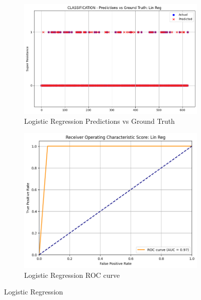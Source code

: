 \documentclass[manuscript,screen,review, nonacm]{acmart}
\begin{document}
  \begin{figure}[H]
      \centering
      \begin{subfigure}{0.45\textwidth}
          \includegraphics[width=\linewidth]{figs/lin1.png}
          \caption{Logistic Regression Predictions vs Ground Truth}

      \end{subfigure}
      \hfill
      \begin{subfigure}{0.45\textwidth}
          \includegraphics[width=\linewidth]{figs/lin2.png}
          \caption{Logistic Regression ROC curve}

      \end{subfigure}
      \caption{Logistic Regression}

  \end{figure}
\end{document}
